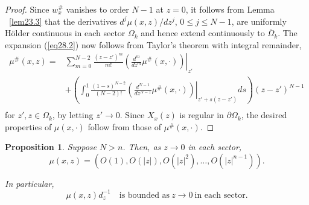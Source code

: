 \documentclass{surv-l}
\theoremstyle{plain}
\newtheorem{prop}[theorem]{Proposition}
\theoremstyle{definition}
\numberwithin{equation}{chapter}
\begin{document}
\begin{proof} Since $w_{x}^{\#}$ vanishes to order $N-1$ at $z=0$, it follows from Lemma ~\ref{lem23.3} that the derivatives $d^{j}\mu(x, z)/dz^{j}$, $0\leq j\leq N-1$, are uniformly H\"{o}lder continuous in each sector $\Omega_{k}$ and hence extend continuously to $\overline{\Omega}_{k}$. The expansion (\ref{eq28.2}) now follows from Taylor's theorem with integral remainder,
\begin{align*}
\mu^{\#}(x, z)= &\sum_{m=0}^{N-2}\frac{(z-z')^{m}}{m!}\left.\left(\frac{d^{m}}{dz^{m}}\mu^{\#}(x, \cdot)\right)\right|_{z'}\\
&+\left(\int_{0}^{1}\frac{(1-s)^{N-2}}{(N-2)!}\left.\left(\frac{d^{N-1}}{dz^{N-1}}\mu^{\#}(x, \cdot)\right)\right|_{z'+s(z-z')}ds\right)(z-z')^{N-1}\\
\end{align*}
for $z',z\in\Omega_{k}$, by letting $z'\rightarrow 0$. Since $X_{x}(z)$ is regular in $\partial\Omega_{k}$, the desired properties of $\mu(x, \cdot)$ follow from those of $\mu^{\#}(x, \cdot)$.
\end{proof}
\setcounter{theorem}{3}
\begin{prop}\label{prop28.4} Suppose $N>n$. Then, as $z \rightarrow 0$ in each sector,
\setcounter{equation}{4}
\begin{equation}
\mu(x,z)=(O(1),O(|z|),O(|z|^{2}),\ldots,O(|z|^{n-1})).
\end{equation}

In  particular,
\begin{equation}\label{eq28.6}
\mu(x, z)d_{z}^{-1}\quad \text{is bounded as}\ z\rightarrow 0\ \text{in each sector}.
\end{equation}
\end{prop}
\end{document}
